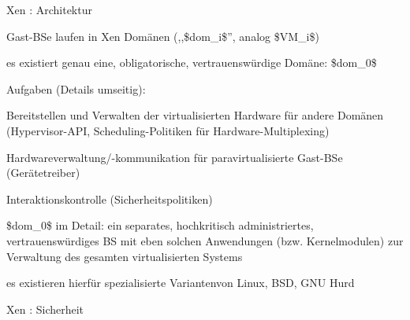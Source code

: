 \documentclass[a4paper]{article}
\begin{document}
\begin{multicols}{3}
    Xen : Architektur

    \begin{itemize*}
        \item
        Gast-BSe laufen in Xen Domänen (,,\$dom\_i\$'', analog \$VM\_i\$)
        \item
        es existiert genau eine, obligatorische, vertrauenswürdige Domäne:
        \$dom\_0\$
        \item
        Aufgaben (Details umseitig):
        \begin{itemize*}
            \item Bereitstellen und Verwalten der virtualisierten Hardware für andere Domänen (Hypervisor-API, Scheduling-Politiken für Hardware-Multiplexing)
            \item Hardwareverwaltung/-kommunikation für paravirtualisierte Gast-BSe (Gerätetreiber)
            \item Interaktionskontrolle (Sicherheitspolitiken)
        \end{itemize*}
        \item
        \$dom\_0\$ im Detail: ein separates, hochkritisch administriertes,
        vertrauenswürdiges BS mit eben solchen Anwendungen (bzw.
        Kernelmodulen) zur Verwaltung des gesamten virtualisierten Systems
        \begin{itemize*}
            \item es existieren hierfür spezialisierte Variantenvon Linux, BSD, GNU Hurd
        \end{itemize*}
    \end{itemize*}

    Xen : Sicherheit


\end{multicols}
\end{document}

